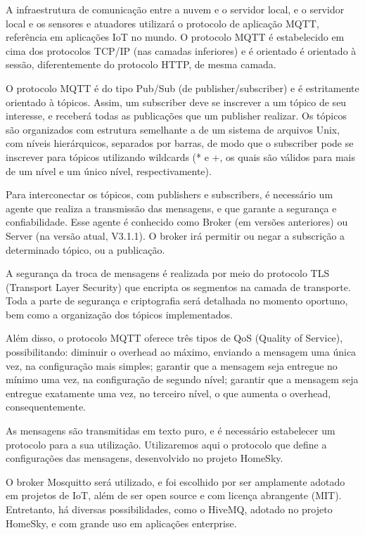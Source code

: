 A infraestrutura de comunicação entre a nuvem e o servidor local, e o servidor local e os sensores e atuadores utilizará o protocolo de aplicação MQTT, referência em aplicações IoT no mundo. O protocolo MQTT é estabelecido em cima dos protocolos TCP/IP (nas camadas inferiores) e é orientado é orientado à sessão, diferentemente do protocolo HTTP, de mesma camada.

O protocolo MQTT é do tipo Pub/Sub (de publisher/subscriber) e é estritamente orientado à tópicos. Assim, um subscriber deve se inscrever a um tópico de seu interesse, e receberá todas as publicações que um publisher realizar. Os tópicos são organizados com estrutura semelhante a de um sistema de arquivos Unix, com níveis hierárquicos, separados por barras, de modo que o subscriber pode se inscrever para tópicos utilizando wildcards (* e +, os quais são válidos para mais de um nível e um único nível, respectivamente).

Para interconectar os tópicos, com publishers e subscribers, é necessário um agente que realiza a transmissão das mensagens, e que garante a segurança e confiabilidade. Esse agente é conhecido como Broker (em versões anteriores) ou Server (na versão atual, V3.1.1). O broker irá permitir ou negar a subscrição a determinado tópico, ou a publicação.

A segurança da troca de mensagens é realizada por meio do protocolo TLS (Transport Layer Security) que encripta os segmentos na camada de transporte. Toda a parte de segurança e criptografia será detalhada no momento oportuno, bem como a organização dos tópicos implementados.

Além disso, o protocolo MQTT oferece três tipos de QoS (Quality of Service), possibilitando: diminuir o overhead ao máximo, enviando a mensagem uma única vez, na configuração mais simples; garantir que a mensagem seja entregue no mínimo uma vez, na configuração de segundo nível; garantir que a mensagem seja entregue exatamente uma vez, no terceiro nível, o que aumenta o overhead, consequentemente.

As mensagens são transmitidas em texto puro, e é necessário estabelecer um protocolo para a sua utilização. Utilizaremos aqui o protocolo que define a configurações das mensagens, desenvolvido no projeto HomeSky.

O broker Mosquitto será utilizado, e foi escolhido por ser amplamente adotado em projetos de IoT, além de ser open source e com licença abrangente (MIT). Entretanto, há diversas possibilidades, como o HiveMQ, adotado no projeto HomeSky, e com grande uso em aplicações enterprise.

